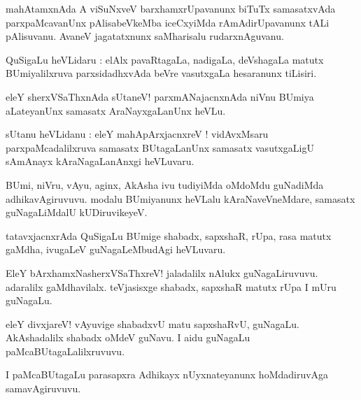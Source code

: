 \documentclass{article}
\begin{document}
\begin{mn}
mahAtamxnAda  A  viSuNxveV barxhamxrUpavanunx biTuTx samasatxvAda 
parxpaMcavanUnx pAlisabeVkeMba iceCxyiMda rAmAdirUpavanunx tALi pAlisuvanu.
AvaneV jagatatxnunx saMharisalu rudarxnAguvanu.
\end{mn}


\begin{mn}
QuSigaLu heVLidaru : elAlx pavaRtagaLa, nadigaLa, deVshagaLa matutx 
BUmiyalilxruva parxsidadhxvAda beVre vasutxgaLa hesaranunx tiLisiri.
\end{mn}

\begin{mn}
eleY sherxVSaThxnAda sUtaneV! parxmANajacnxnAda niVnu BUmiya aLateyanUnx 
samasatx AraNayxgaLanUnx heVLu.
\end{mn}

\begin{mn}
sUtanu heVLidanu : eleY mahApArxjacnxreV ! vidAvxMsaru parxpaMcadalilxruva 
samasatx BUtagaLanUnx samasatx vasutxgaLigU sAmAnayx kAraNagaLanAnxgi heVLuvaru.
\end{mn}

\begin{mn}
BUmi, niVru, vAyu, aginx, AkAsha ivu tudiyiMda oMdoMdu guNadiMda adhikavAgiruvuvu.
modalu BUmiyanunx heVLalu kAraNaveVneMdare, samasatx guNagaLiMdalU kUDiruvikeyeV.
\end{mn}

\begin{mn}
tatavxjacnxrAda QuSigaLu BUmige shabadx, sapxshaR, rUpa, rasa matutx gaMdha, 
ivugaLeV guNagaLeMbudAgi heVLuvaru.
\end{mn}

\begin{mn}
EleY bArxhamxNasherxVSaThxreV! jaladalilx nAlukx guNagaLiruvuvu. 
adaralilx gaMdhavilalx. teVjasisxge shabadx, sapxshaR matutx rUpa I mUru guNagaLu.
\end{mn}

\begin{mn}
eleY divxjareV! vAyuvige shabadxvU matu sapxshaRvU, guNagaLu. 
AkAshadalilx shabadx oMdeV guNavu. I aidu guNagaLu paMcaBUtagaLalilxruvuvu.
\end{mn}

\begin{mn}
I paMcaBUtagaLu parasapxra Adhikayx nUyxnateyanunx hoMdadiruvAga samavAgiruvuvu.
\end{mn}
\end{document}
